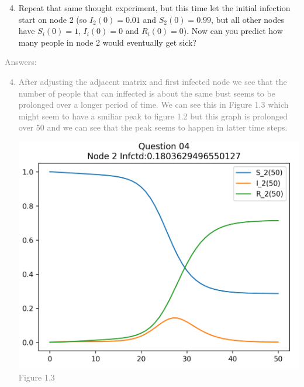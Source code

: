 \documentclass[11pt]{article}
\begin{document}
\begin{enumerate}
	\setcounter{enumi}{3}
	\item Repeat that same thought experiment, but this time let the initial infection start on node 2 (so $I_2(0) = 0.01$ and $S_2(0) = 0.99$, but all other nodes have $S_i(0)=1$, $I_i(0)=0$  and $R_i(0)=0$). Now can you predict how many people in node 2 would eventually get sick?
\end{enumerate}
\textcolor{gray}{
Answers:
\begin{enumerate}
	\setcounter{enumi}{3}
	\item After adjusting the adjacent matrix and first infected node we see that the number of people that can inffected is about the same bust seems to be prolonged over a longer period of time. We can see this in Figure 1.3 which might seem to have a smiliar peak to figure 1.2 but this graph is prolonged over 50 and we can see that the peak seems to happen in latter time steps. 
\begin{center}
	\includegraphics[scale=0.8]{Figure1.3}\\
	Figure 1.3
\end{center}
\end{enumerate}
}
\end{document}
